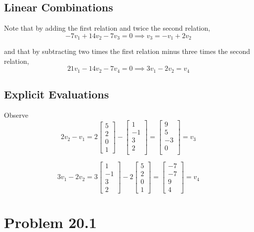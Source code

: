 \documentclass{article}
\theoremstyle{named}
\begin{document}
\subsection{Linear Combinations}

Note that by adding the first relation and twice the second relation,
\[
    -7v_1 + 14v_2 - 7v_3 = 0 \implies v_3 = -v_1 + 2v_2
\]

and that by subtracting two times the first relation minus three times the second relation,
\[
    21v_1 -14v_2 -7v_4 = 0 \implies 3v_1 - 2v_2 = v_4
\]

\subsection{Explicit Evaluations}

Observe
\[
    2v_2 - v_1 = 2\begin{bmatrix} 5 \\ 2 \\ 0 \\ 1 \end{bmatrix} - \begin{bmatrix} 1 \\ -1 \\ 3\\ 2 \\ \end{bmatrix} = \begin{bmatrix} 9 \\ 5\\ -3 \\ 0 \\ \end{bmatrix} = v_3 
\]

\[
    3v_1 - 2v_2 = 3\begin{bmatrix} 1 \\ -1 \\ 3 \\ 2 \end{bmatrix} - 2 \begin{bmatrix} 5 \\ 2 \\ 0 \\ 1 \end{bmatrix} = \begin{bmatrix} -7 \\ -7 \\ 9 \\ 4 \end{bmatrix} = v_4
\]

\section{Problem 20.1}
\end{document}
